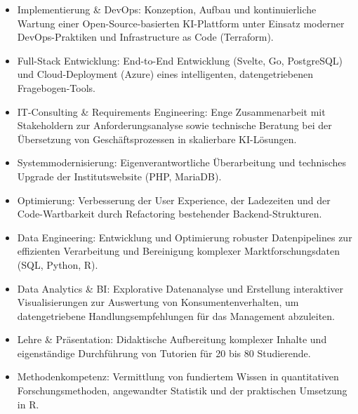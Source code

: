 \begin{itemize}[noitemsep,leftmargin=3.5mm,rightmargin=0mm,topsep=6pt]
  \item Implementierung \& DevOps: Konzeption, Aufbau und kontinuierliche Wartung einer Open-Source-basierten KI-Plattform unter Einsatz moderner DevOps-Praktiken und Infrastructure as Code (Terraform).
  \item Full-Stack Entwicklung: End-to-End Entwicklung (Svelte, Go, PostgreSQL) und Cloud-Deployment (Azure) eines intelligenten, datengetriebenen Fragebogen-Tools.
  \item IT-Consulting \& Requirements Engineering: Enge Zusammenarbeit mit Stakeholdern zur Anforderungsanalyse sowie technische Beratung bei der Übersetzung von Geschäftsprozessen in skalierbare KI-Lösungen.
\end{itemize}

\medskip

\begin{itemize}[noitemsep,leftmargin=3.5mm,rightmargin=0mm,topsep=6pt]
    \item Systemmodernisierung: Eigenverantwortliche Überarbeitung und technisches Upgrade der Institutswebsite (PHP, MariaDB).
    \item Optimierung: Verbesserung der User Experience, der Ladezeiten und der Code-Wartbarkeit durch Refactoring bestehender Backend-Strukturen.
\end{itemize}

\medskip

\begin{itemize}[noitemsep,leftmargin=3.5mm,rightmargin=0mm,topsep=6pt]
  \item Data Engineering: Entwicklung und Optimierung robuster Datenpipelines zur effizienten Verarbeitung und Bereinigung komplexer Marktforschungsdaten (SQL, Python, R).
  \item Data Analytics \& BI: Explorative Datenanalyse und Erstellung interaktiver Visualisierungen zur Auswertung von Konsumentenverhalten, um datengetriebene Handlungsempfehlungen für das Management abzuleiten.
\end{itemize}

\medskip

\begin{itemize}[noitemsep,leftmargin=3.5mm,rightmargin=0mm,topsep=6pt]
  \item Lehre \& Präsentation: Didaktische Aufbereitung komplexer Inhalte und eigenständige Durchführung von Tutorien für 20 bis 80 Studierende.
  \item Methodenkompetenz: Vermittlung von fundiertem Wissen in quantitativen Forschungsmethoden, angewandter Statistik und der praktischen Umsetzung in R.
\end{itemize}

